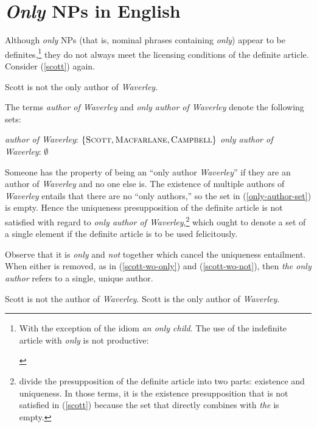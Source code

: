 \section{\textit{Only} NPs in English \label{sec:only-nps-english}}
Although \textit{only} NPs (that is, nominal phrases containing \textit{only}) appear to be definites,\footnote{With the exception of the idiom \textit{an only child}. The use of the indefinite article with \textit{only} is not productive: \begin{exe}  \end{exe}} they do not always meet the licensing conditions of the definite article. Consider (\ref{scott}) again.

\begin{exe}
	 Scott is not the only author of \textit{Waverley}.
\end{exe}

The terms \textit{author of Waverley} and \textit{only author of Waverley} denote the following sets:

\begin{exe}
	\ex \textit{author of Waverley}: $\lbrace \textsc{Scott}, \textsc{Macfarlane}, \textsc{Campbell} \rbrace$
	\ex \label{only-author-set} \textit{only author of Waverley}: $\emptyset$
\end{exe}

Someone has the property of being an ``only author \textit{Waverley}'' if they are an author of \textit{Waverley} and no one else is. The existence of multiple authors of \textit{Waverley} entails that there are no ``only authors,'' so the set in (\ref{only-author-set}) is empty. Hence the uniqueness presupposition of the definite article is not satisfied with regard to \textit{only author of Waverley},\footnote{\citet{cb2015} divide the presupposition of the definite article into two parts: existence and uniqueness. In those terms, it is the existence presupposition that is not satisfied in (\ref{scott}) because the set that directly combines with \textit{the} is empty.} which ought to denote a set of a single element if the definite article is to be used felicitously.

Observe that it is \textit{only} and \textit{not} together which cancel the uniqueness entailment. When either is removed, as in (\ref{scott-wo-only}) and (\ref{scott-wo-not}), then \textit{the only author} refers to a single, unique author.

\begin{exe}
	\ex \label{scott-wo-only} Scott is not the author of \textit{Waverley}.
	\ex \label{scott-wo-not} Scott is the only author of \textit{Waverley}.
\end{exe}

